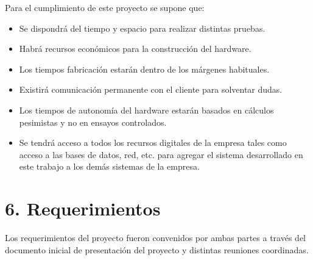 \documentclass[
11pt, %
codirector, %
]{charter}
\begin{document}
Para el cumplimiento de este proyecto se supone que: 

\begin{itemize}
\item Se dispondrá del tiempo y espacio para realizar distintas pruebas.
\item Habrá recursos económicos para la construcción del hardware.
\item Los tiempos fabricación estarán dentro de los márgenes habituales.
\item Existirá comunicación permanente con el cliente para solventar dudas.
\item Los tiempos de autonomía del hardware estarán basados en cálculos pesimistas y no en ensayos controlados.
\item Se tendrá acceso a todos los recursos digitales de la empresa tales como acceso a las bases de datos, red, etc. para agregar el sistema desarrollado en este trabajo a los demás sistemas de la empresa.
\end{itemize}


\section{6. Requerimientos}
\label{sec:requerimientos}

Los requerimientos del proyecto fueron convenidos por ambas partes a través del documento inicial de presentación del proyecto y distintas reuniones coordinadas. 
\end{document}
